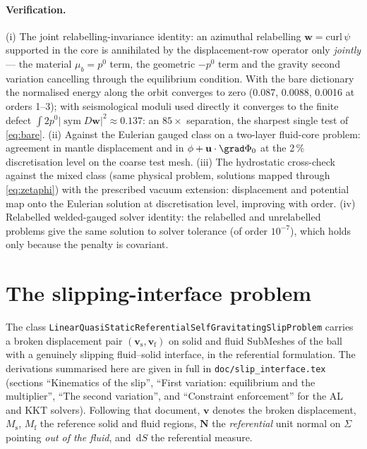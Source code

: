 \documentclass[11pt]{article}
\numberwithin{equation}{section}
\theoremstyle{remark}
\newcommand{\dS}{\,\mathrm{d}S}
\newcommand{\sym}{\operatorname{sym}}
\newcommand{\vu}{\mathbf{u}}
\newcommand{\vv}{\mathbf{v}}
\newcommand{\vw}{\mathbf{w}}
\newcommand{\vN}{\mathbf{N}}
\newcommand{\code}[1]{\texttt{#1}}
\begin{document}
\paragraph{Verification.} (i) The joint relabelling-invariance identity: an
azimuthal relabelling $\vw = \mathrm{curl}\,\psi$ supported in the core is
annihilated by the displacement-row operator only \emph{jointly} --- the
material $\mu_b = p^0$ term, the geometric $-p^0$ term and the gravity
second variation cancelling through the equilibrium condition. With the
bare dictionary the normalised energy along the orbit converges to zero
(0.087, 0.0088, 0.0016 at orders 1--3); with seismological moduli used
directly it converges to the finite defect $\int2p^0|\sym D\vw|^2\approx
0.137$: an $85\times$ separation, the sharpest single test of
\eqref{eq:bare}. (ii) Against the Eulerian gauged class on a two-layer
fluid-core problem: agreement in mantle displacement and in
$\phi + \vu\cdot\grad\Phi_0$ at the 2\,\% discretisation level on the coarse
test mesh. (iii) The hydrostatic cross-check against the mixed class (same
physical problem, solutions mapped through
\eqref{eq:zetaphi}) with the prescribed
vacuum extension: displacement and potential map onto the Eulerian
solution at discretisation level, improving with order. (iv) Relabelled
welded-gauged solver identity: the relabelled and unrelabelled problems
give the same solution to solver tolerance (of order $10^{-7}$), which
holds only because the penalty is covariant.

\section{The slipping-interface problem}
\label{sec:slip}

The class \code{LinearQuasiStaticReferentialSelfGravitatingSlipProblem}
carries a broken displacement pair $(\vv_{\mathrm{s}},\vv_{\mathrm{f}})$
on solid and fluid SubMeshes of the ball with a genuinely slipping
fluid--solid interface, in the referential formulation. The derivations
summarised here are given in full in \code{doc/slip\_interface.tex}
(sections ``Kinematics of the slip'', ``First variation: equilibrium and
the multiplier'', ``The second variation'', and ``Constraint enforcement''
for the AL and KKT solvers). Following that document, $\vv$ denotes the
broken displacement, $M_{\mathrm{s}}$, $M_{\mathrm{f}}$ the reference solid
and fluid regions, $\vN$ the \emph{referential} unit normal on $\Sigma$
pointing \emph{out of the fluid}, and $\dS$ the referential measure.
\end{document}
